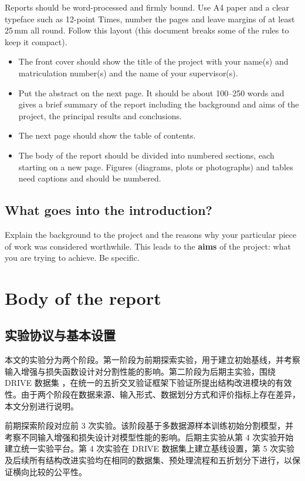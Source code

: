 \documentclass[a4paper,12pt]{article}
\begin{document}
Reports should be word-processed and firmly bound. Use A4 paper and a clear typeface such as 12-point Times, number the pages and leave margins of at least 25\,mm all round. Follow this layout (this document breaks some of the rules to keep it compact).
\begin{itemize}
\item
The front cover should show the title of the project with your name(s) and matriculation number(s) and the name of your supervisor(s).
\item
Put the abstract on the next page. It should be about 100--250 words and gives a brief summary of the report including the background and aims of the project, the principal results and conclusions.
\item
The next page should show the table of contents. 
\item
The body of the report should be divided into numbered sections, each starting on a new page. Figures (diagrams, plots or photographs) and tables need captions and should be numbered.
\end{itemize}

\subsection{What goes into the introduction?}

Explain the background to the project and the reasons why your particular piece of work was considered worthwhile. This leads to the \textbf{aims} of the project: what you are trying to achieve. Be specific.


\section{Body of the report}

\subsection{实验协议与基本设置}

本文的实验分为两个阶段。第一阶段为前期探索实验，用于建立初始基线，并考察输入增强与损失函数设计对分割性能的影响。第二阶段为后期主实验，围绕 DRIVE 数据集 \cite{staal2004drive}，在统一的五折交叉验证框架下验证所提出结构改进模块的有效性。由于两个阶段在数据来源、输入形式、数据划分方式和评价指标上存在差异，本文分别进行说明。

前期探索阶段对应前 3 次实验。该阶段基于多数据源样本训练初始分割模型，并考察不同输入增强和损失设计对模型性能的影响。后期主实验从第 4 次实验开始建立统一实验平台。第 4 次实验在 DRIVE 数据集上建立基线设置，第 5 次实验及后续所有结构改进实验均在相同的数据集、预处理流程和五折划分下进行，以保证横向比较的公平性。
\end{document}
